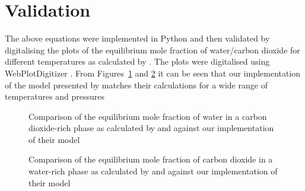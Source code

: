 

\section{Validation}
\label{sec:appb_validation}
The above equations were implemented in Python and then validated by digitalising the plots of the equilibrium mole fraction of water/carbon dioxide for different temperatures as calculated by \citeauthor{Spycher2009}. The plots were digitalised using WebPlotDigitizer \cite{Rohatgi2024}. From Figures~\ref{fig:SP2009_validation_yH2O} and \ref{fig:SP2009_validation_xCO2} it can be seen that our implementation of the model presented by \citeauthor{Spycher2009} matches their calculations for a wide range of temperatures and pressures

    \begin{figure}[H]
        \centering
                
        \caption{Comparison of the equilibrium mole fraction of water in a carbon dioxide-rich phase as calculated by \citeauthor{Spycher2003} and \citeauthor{Spycher2009} against our implementation of their model}
        \label{fig:SP2009_validation_yH2O}
    \end{figure}
    \begin{figure}[H]
        \centering
                
        \caption{Comparison of the equilibrium mole fraction of carbon dioxide in a water-rich phase as calculated by \citeauthor{Spycher2003} and \citeauthor{Spycher2009} against our implementation of their model}
        \label{fig:SP2009_validation_xCO2}
    \end{figure}
